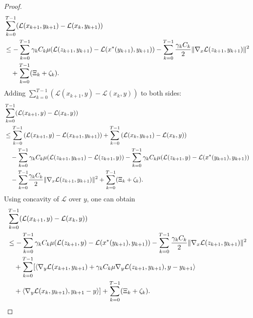 \documentclass[letterpaper,11 pt]{article}
\def\ml{\mathcal L}
\newcommand{\mor}[1]{{\color{black}#1}}
\newcommand{\zal}[1]{{\color{black}#1}}
\newcommand{\mb}[1]{{\color{black}#1}}
\begin{document}
\begin{proof}
\begin{align*}
 &\sum_{k=0}^{T-1}(\ml(x_{k+1},y_{k+1})-\ml(x_{k},y_{k+1}))\\ \nonumber&\leq-\sum_{k=0}^{T-1}\gamma_k C_k\mu(\ml{(z_{k+1},y_{k+1})}-\ml(x^\ast\zal{(y_{k+1})},y_{k+1}))
-\sum_{k=0}^{T-1}{\gamma_k C_k\over 2}\|\nabla_x \ml{(z_{k+1},y_{k+1})}\|^2\\ \nonumber&\quad+\mb{{\sum_{k=0}^{T-1}(\Xi_k+\zeta_k)}.}
\end{align*}
Adding $\sum_{k=0}^{T-1}(\ml(x_{k+1},y)-\ml(x_{k},y))$ to both sides:
\begin{align*}
\nonumber &\sum_{k=0}^{T-1}(\ml(x_{k+1},y)-\ml(x_{k},y))\\
\nonumber&\leq
 \sum_{k=0}^{T-1}{(\ml(x_{k+1},y)-\ml(x_{k+1},y_{k+1}))}
+ \sum_{k=0}^{T-1}{(\ml(x_{k},y_{k+1})-\ml(x_{k},y))}\\ \nonumber&\quad- \sum_{k=0}^{T-1}\zal{\gamma_k C_k\mu}{(\ml(z_{k+1},y_{k+1})-\ml(z_{k+1},y)\zal{)}}-\sum_{k=0}^{T-1}\gamma_k C_k\mu (\ml(z_{k+1},y)-\ml(x^*(y_{k+1}),y_{k+1}))\\
\nonumber &\quad-\zal{\sum_{k=0}^{T-1}}{\gamma_k C_k\over 2}\|\nabla_x \ml{(z_{k+1},y_{k+1})}\|^2+\mb{\sum_{k=0}^{T-1}(\Xi_k+\zeta_k)}.
\end{align*}
Using concavity of $\ml$ over $y$, one can obtain
\begin{align}\label{align14}
\nonumber &\sum_{k=0}^{T-1}(\ml(x_{k+1},y)-\ml(x_{k},y))\\
\nonumber&\leq -\sum_{k=0}^{T-1}\gamma_k C_k\mu(\ml{(z_{k+1},y)}-\ml({x^\ast\zal{(y_{k+1})},y_{k+1}})\zal{)}
-\sum_{k=0}^{T-1}{\gamma_k C_k\over 2}\|\nabla_x \ml{(z_{k+1},y_{k+1})}\|^2\\ \nonumber&\quad+\sum_{k=0}^{T-1}[\langle\nabla_y\ml{(x_{k+1},y_{k+1})}+\gamma_kC_k\mu\nabla_y\ml{(z_{k+1},y_{k+1})},y-y_{k+1}\rangle\\&\quad
+\langle
\nabla_y\ml{(x_{k},y_{k+1})},y_{k+1}-y\rangle
]+\mb{\sum_{k=0}^{T-1}(\Xi_k+\zeta_k)}.
\end{align}

\end{proof}
\end{document}
